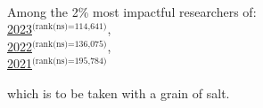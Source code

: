 
{
    \ifdefined\shortcv
        {}
    \else
        {
            \\
            \hspace*{\fill}Among the 2\% most impactful researchers of:\\
            \hspace*{\fill}
            \href{https://elsevier.digitalcommonsdata.com/datasets/btchxktzyw/7}{2023}$^\text{(rank(ns)=114,641)}$,\\
            \hspace*{\fill}
            \href{https://elsevier.digitalcommonsdata.com/datasets/btchxktzyw/6}{2022}$^\text{(rank(ns)=136,075)}$,\\
            \hspace*{\fill}
            \href{https://elsevier.digitalcommonsdata.com/datasets/btchxktzyw/4}{2021}$^\text{(rank(ns)=195,784)}$\phantom{,}

            
            
            \hspace*{\fill}which is to be taken with a grain of salt. 
        }
    \fi
}





